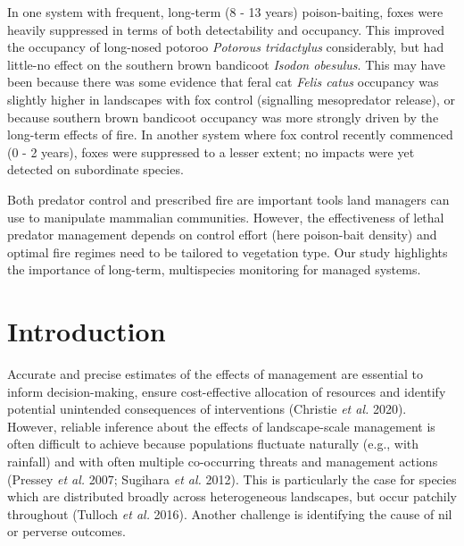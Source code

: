 \documentclass[11pt,a4paper,titlepage,twoside,openright]{style/unimelbthesis}
\begin{document}
\begin{mainmatter}
In one system with frequent, long-term (8 - 13 years) poison-baiting, foxes were heavily suppressed in terms of both detectability and occupancy. This improved the occupancy of long-nosed potoroo \emph{Potorous tridactylus} considerably, but had little-no effect on the southern brown bandicoot \emph{Isodon obesulus}. This may have been because there was some evidence that feral cat \emph{Felis catus} occupancy was slightly higher in landscapes with fox control (signalling mesopredator release), or because southern brown bandicoot occupancy was more strongly driven by the long-term effects of fire. In another system where fox control recently commenced (0 - 2 years), foxes were suppressed to a lesser extent; no impacts were yet detected on subordinate species.

Both predator control and prescribed fire are important tools land managers can use to manipulate mammalian communities. However, the effectiveness of lethal predator management depends on control effort (here poison-bait density) and optimal fire regimes need to be tailored to vegetation type. Our study highlights the importance of long-term, multispecies monitoring for managed systems.

\newpage

\hypertarget{introduction-1}{%
\section{Introduction}\label{introduction-1}}

Accurate and precise estimates of the effects of management are essential to inform decision-making, ensure cost-effective allocation of resources and identify potential unintended consequences of interventions (Christie \emph{et al.} 2020). However, reliable inference about the effects of landscape-scale management is often difficult to achieve because populations fluctuate naturally (e.g., with rainfall) and with often multiple co-occurring threats and management actions (Pressey \emph{et al.} 2007; Sugihara \emph{et al.} 2012). This is particularly the case for species which are distributed broadly across heterogeneous landscapes, but occur patchily throughout (Tulloch \emph{et al.} 2016). Another challenge is identifying the cause of nil or perverse outcomes.


\end{mainmatter}
\end{document}

